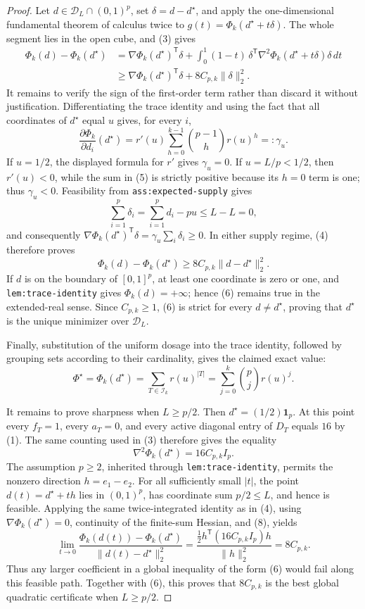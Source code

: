 \documentclass{article}
\begin{document}
\begin{proof}
Let \(d\in\mathcal D_L\cap(0,1)^p\), set \(\delta=d-d^\star\), and apply the one-dimensional fundamental theorem of calculus twice to \(g(t)=\Phi_k(d^\star+t\delta)\).  The whole segment lies in the open cube, and (3) gives
\[
\begin{aligned}
 \Phi_k(d)-\Phi_k(d^\star)
 &=\nabla\Phi_k(d^\star)^{\mathsf T}\delta
   +\int_0^1(1-t)\,\delta^{\mathsf T}
       \nabla^2\Phi_k(d^\star+t\delta)\delta\,dt\\
 &\ge \nabla\Phi_k(d^\star)^{\mathsf T}\delta
   +8C_{p,k}\|\delta\|_2^2. \tag{4}
\end{aligned}
\]
It remains to verify the sign of the first-order term rather than discard it without justification.  Differentiating the trace identity and using the fact that all coordinates of \(d^\star\) equal \(u\) gives, for every \(i\),
\[
 \frac{\partial\Phi_k}{\partial d_i}(d^\star)
 =r'(u)\sum_{h=0}^{k-1}\binom{p-1}{h}r(u)^h
 =:\gamma_u. \tag{5}
\]
If \(u=1/2\), the displayed formula for \(r'\) gives \(\gamma_u=0\).  If \(u=L/p<1/2\), then \(r'(u)<0\), while the sum in (5) is strictly positive because its \(h=0\) term is one; thus \(\gamma_u<0\).  Feasibility from \texttt{ass:expected-supply} gives
\[
 \sum_{i=1}^p\delta_i=\sum_{i=1}^p d_i-pu\le L-L=0,
\]
and consequently
\(\nabla\Phi_k(d^\star)^{\mathsf T}\delta
=\gamma_u\sum_i\delta_i\ge0\).  In either supply regime, (4) therefore proves
\[
 \Phi_k(d)-\Phi_k(d^\star)
 \ge8C_{p,k}\|d-d^\star\|_2^2. \tag{6}
\]
If \(d\) is on the boundary of \([0,1]^p\), at least one coordinate is zero or one, and \texttt{lem:trace-identity} gives \(\Phi_k(d)=+\infty\); hence (6) remains true in the extended-real sense.  Since \(C_{p,k}\ge1\), (6) is strict for every \(d\ne d^\star\), proving that \(d^\star\) is the unique minimizer over \(\mathcal D_L\).

Finally, substitution of the uniform dosage into the trace identity, followed by grouping sets according to their cardinality, gives the claimed exact value:
\[
 \Phi^\star=\Phi_k(d^\star)
 =\sum_{T\in\mathcal I_k}r(u)^{|T|}
 =\sum_{j=0}^k\binom pj r(u)^j. \tag{7}
\]

It remains to prove sharpness when \(L\ge p/2\).  Then \(d^\star=(1/2)\mathbf 1_p\).  At this point every \(f_T=1\), every \(a_T=0\), and every active diagonal entry of \(D_T\) equals \(16\) by (1).  The same counting used in (3) therefore gives the equality
\[
 \nabla^2\Phi_k(d^\star)=16C_{p,k}I_p. \tag{8}
\]
The assumption \(p\ge2\), inherited through \texttt{lem:trace-identity}, permits the nonzero direction \(h=e_1-e_2\).  For all sufficiently small \(|t|\), the point \(d(t)=d^\star+th\) lies in \((0,1)^p\), has coordinate sum \(p/2\le L\), and hence is feasible.  Applying the same twice-integrated identity as in (4), using \(\nabla\Phi_k(d^\star)=0\), continuity of the finite-sum Hessian, and (8), yields
\[
 \lim_{t\to0}
 \frac{\Phi_k(d(t))-\Phi_k(d^\star)}
      {\|d(t)-d^\star\|_2^2}
 =\frac{\frac12 h^{\mathsf T}(16C_{p,k}I_p)h}{\|h\|_2^2}
 =8C_{p,k}. \tag{9}
\]
Thus any larger coefficient in a global inequality of the form (6) would fail along this feasible path.  Together with (6), this proves that \(8C_{p,k}\) is the best global quadratic certificate when \(L\ge p/2\).
\end{proof}
\end{document}
